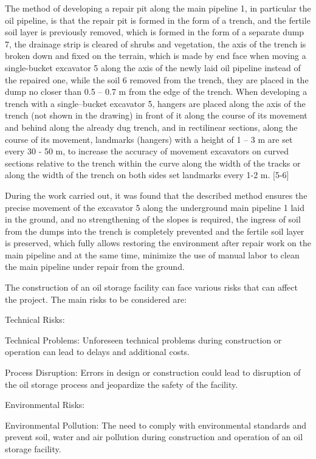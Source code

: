 \begin{multicols}{2}
The method of developing a repair pit along the main pipeline 1, in
particular the oil pipeline, is that the repair pit is formed in the
form of a trench, and the fertile soil layer is previously removed,
which is formed in the form of a separate dump 7, the drainage strip is
cleared of shrubs and vegetation, the axis of the trench is broken down
and fixed on the terrain, which is made by end face when moving a
single-bucket excavator 5 along the axis of the newly laid oil pipeline
instead of the repaired one, while the soil 6 removed from the trench,
they are placed in the dump no closer than 0.5 -- 0.7 m from the edge of
the trench. When developing a trench with a single--bucket excavator 5,
hangers are placed along the axis of the trench (not shown in the
drawing) in front of it along the course of its movement and behind
along the already dug trench, and in rectilinear sections, along the
course of its movement, landmarks (hangers) with a height of 1 -- 3 m
are set every 30 - 50 m, to increase the accuracy of movement excavators
on curved sections relative to the trench within the curve along the
width of the tracks or along the width of the trench on both sides set
landmarks every 1-2 m. {[}5-6{]}

During the work carried out, it was found that the described method
ensures the precise movement of the excavator 5 along the underground
main pipeline 1 laid in the ground, and no strengthening of the slopes
is required, the ingress of soil from the dumps into the trench is
completely prevented and the fertile soil layer is preserved, which
fully allows restoring the environment after repair work on the main
pipeline and at the same time, minimize the use of manual labor to clean
the main pipeline under repair from the ground.

The construction of an oil storage facility can face various risks that
can affect the project. The main risks to be considered are:

Technical Risks:

Technical Problems: Unforeseen technical problems during construction or
operation can lead to delays and additional costs.

Process Disruption: Errors in design or construction could lead to
disruption of the oil storage process and jeopardize the safety of the
facility.

Environmental Risks:

Environmental Pollution: The need to comply with environmental standards
and prevent soil, water and air pollution during construction and
operation of an oil storage facility.


\end{multicols}
